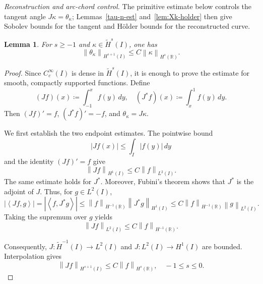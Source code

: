 \documentclass[11pt,reqno]{amsart}
\theoremstyle{plain}
\newtheorem{lemma}[theorem]{Lemma}
\theoremstyle{definition}
\numberwithin{equation}{section}
\newcommand{\wt}[1]{\widetilde{#1}}
\newcommand{\abs}[1]{\left\lvert #1 \right\rvert}
\newcommand{\norm}[1]{\left\lVert #1 \right\rVert}
\newcommand{\dual}[2]{\left\langle #1,#2 \right\rangle}
\newcommand{\R}{\mathbb{R}}
\newcommand{\hi}[1]{H^{#1}(I)}
\newcommand{\thi}[1]{\wt H^{#1}(I)}
\newcommand{\hr}[1]{H^{#1}(\R)}
\begin{document}
\emph{Reconstruction and arc-chord control.}
The primitive estimate below controls the tangent angle $J\kappa=\theta_\kappa$;
Lemmas~\ref{tau-n-est} and~\ref{lem:Xk-holder} then give Sobolev bounds
for the tangent and H\"older bounds for the reconstructed curve.

\begin{lemma}\label{lem:theta-kappa}
For $s\ge -1$ and $\kappa\in\thi{s}$, one has
\begin{equation}\label{eqn:theta-Hs+1}
    \norm{\theta_\kappa}_{\hi{s+1}} \le C \norm{\kappa}_{\hr{s}}.
\end{equation}
\end{lemma}
\begin{proof}
Since $C_c^\infty(I)$ is dense in $\thi{s}$, it is enough to prove the
estimate for smooth, compactly supported functions. Define
\begin{equation}
    (Jf)(x) \coloneqq \int_{-1}^x f(y)\,dy,
    \quad
    (J^*f)(x) \coloneqq \int_x^1 f(y)\,dy.
\end{equation}
Then $(Jf)'=f$, $(J^*f)'=-f$, and $\theta_\kappa=J\kappa$.

We first establish the two endpoint estimates. The pointwise bound
\begin{equation}
    \abs{Jf(x)} \le \int_I \abs{f(y)}\,dy
\end{equation}
and the identity $(Jf)'=f$ give
\begin{equation}\label{eqn:Jf-1}
    \norm{Jf}_{\hi{1}} \le C\norm{f}_{L^2(I)}.
\end{equation}
The same estimate holds for $J^*$. Moreover, Fubini's theorem shows that
$J^*$ is the adjoint of $J$. Thus, for $g\in L^2(I)$,
\begin{equation}
    \abs{\dual{Jf}{g}}
    = \abs{\dual{f}{J^*g}}
    \le \norm{f}_{\hr{-1}}\norm{J^*g}_{\hi{1}}
    \le C\norm{f}_{\hr{-1}}\norm{g}_{L^2(I)}.
\end{equation}
Taking the supremum over $g$ yields
\begin{equation}\label{eqn:Jf-2}
    \norm{Jf}_{L^2(I)} \le C \norm{f}_{\hr{-1}}.
\end{equation}

Consequently, $J:\thi{-1}\to L^2(I)$ and
$J:L^2(I)\to \hi{1}$ are bounded. Interpolation gives
\begin{equation}
    \norm{Jf}_{\hi{s+1}} \le C\norm{f}_{\hr{s}},
    \quad -1\le s\le 0.
\end{equation}


\end{proof}
\end{document}
